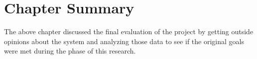 \section{Chapter Summary}

The above chapter discussed the final evaluation of the project by getting outside opinions about the system and analyzing those data to see if the original goals were met during the phase of this research. 
